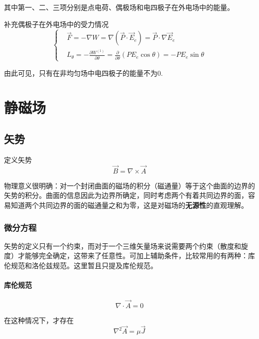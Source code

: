 \documentclass[UTF8]{ctexart}
\begin{document}
\noindent 其中第一、二、三项分别是点电荷、偶极场和电四极子在外电场中的能量。

    补充偶极子在外电场中的受力情况
    \begin{equation}
        \left \{ \begin{aligned}
            &\vec{F} = - \nabla W = \nabla(\vec{P} \cdot \vec{E}_e) = \vec{P} \cdot \nabla \vec{E}_e \\ 
            &L_{\theta} = - \frac{\partial W^{(1)}}{\partial \theta} = \frac{\partial}{\partial \theta}(P E_e \cos \theta) = - P E_e \sin \theta 
        \end{aligned} \right.
    \end{equation}

\noindent 由此可见，只有在非均匀场中电四极子的能量不为0.

    \section{静磁场}
    \subsection{矢势}
    定义矢势
    \begin{equation}
        \vec{B} = \nabla \times \vec{A}
    \end{equation}

\noindent 物理意义很明确：对一个封闭曲面的磁场的积分（磁通量）等于这个曲面的边界的矢势的积分。曲面的信息因此为边界所确定，同时考虑两个有着共同边界的面，容易知道两个共同边界的面的磁通量之和为零，这是对磁场的\textbf{无源性}的直观理解。

    \subsubsection{微分方程}
    矢势的定义只有一个约束，而对于一个三维矢量场来说需要两个约束（散度和旋度）才能够完全确定，这带来了任意性。可加上辅助条件，比较常用的有两种：库伦规范和洛伦兹规范。这里暂且只提及库伦规范。
    \paragraph{库伦规范}
    \begin{equation}
        \nabla \cdot  \vec{A} = 0
    \end{equation}

\noindent 在这种情况下，才存在
\begin{equation}
    \nabla^2 \vec{A} = \mu \vec{J}
\end{equation}
\end{document}
